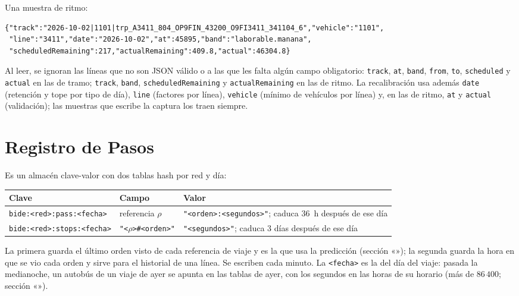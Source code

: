 \noindent Una muestra de ritmo:

\begin{lstlisting}[numbers=none]
{"track":"2026-10-02|1101|trp_A3411_804_OP9FIN_43200_O9FI3411_341104_6","vehicle":"1101",
 "line":"3411","date":"2026-10-02","at":45895,"band":"laborable.manana",
 "scheduledRemaining":217,"actualRemaining":409.8,"actual":46304.8}
\end{lstlisting}

\noindent Al leer, se ignoran las líneas que no son JSON válido o a las que les falta algún campo obligatorio:
\texttt{track}, \texttt{at}, \texttt{band}, \texttt{from}, \texttt{to}, \texttt{scheduled} y \texttt{actual} en las de
tramo; \texttt{track}, \texttt{band}, \texttt{scheduledRemaining} y \texttt{actualRemaining} en las de ritmo. La
recalibración usa además \texttt{date} (retención y tope por tipo de día), \texttt{line} (factores por línea),
\texttt{vehicle} (mínimo de vehículos por línea) y, en las de ritmo, \texttt{at} y \texttt{actual} (validación); las
muestras que escribe la captura los traen siempre.

\section{Registro de Pasos}

Es un almacén clave-valor con dos tablas hash por red y día:

\begin{center}
\small
\begin{tabularx}{\textwidth}{@{}llX@{}}
\toprule
Clave & Campo & Valor\\
\midrule
\texttt{bide:<red>:pass:<fecha>} & referencia $\rho$ & \texttt{"<orden>:<segundos>"}; caduca 36~h después de ese día\\
\texttt{bide:<red>:stops:<fecha>} & \texttt{"<}$\rho$\texttt{>\#<orden>"} & \texttt{"<segundos>"}; caduca 3 días después de ese día\\
\bottomrule
\end{tabularx}
\end{center}

\noindent La primera guarda el último orden visto de cada referencia de viaje y es la que usa la predicción
(sección «»); la segunda guarda la hora en que se vio cada orden y sirve para el historial de una
línea. Se escriben cada minuto. La \texttt{<fecha>} es la del día del viaje: pasada la medianoche, un autobús de un
viaje de ayer se apunta en las tablas de ayer, con los segundos en las horas de su horario (más de $86\,400$; sección
«»).

